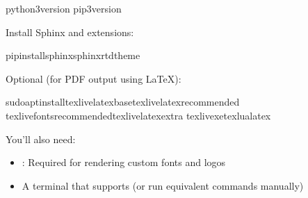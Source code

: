 \documentclass[letterpaper,11pt,oneside,english,openany,oneside]{sphinxmanual}
\begin{document}
\begin{sphinxVerbatim}[commandchars=\\\{\}]
python3\PYGZhy{}\PYGZhy{}version
pip3\PYGZhy{}\PYGZhy{}version
\end{sphinxVerbatim}

\sphinxAtStartPar
Install Sphinx and extensions:

\begin{sphinxVerbatim}[commandchars=\\\{\}]
pipinstallsphinxsphinx\PYGZus{}rtd\PYGZus{}theme
\end{sphinxVerbatim}

\sphinxAtStartPar
Optional (for PDF output using LaTeX):

\begin{sphinxVerbatim}[commandchars=\\\{\}]
sudoaptinstalltexlive\PYGZhy{}latex\PYGZhy{}basetexlive\PYGZhy{}latex\PYGZhy{}recommended
texlive\PYGZhy{}fonts\PYGZhy{}recommendedtexlive\PYGZhy{}latex\PYGZhy{}extra
texlive\PYGZhy{}xetexlualatex
\end{sphinxVerbatim}

\sphinxAtStartPar
You’ll also need:
\begin{itemize}
\item {} 
\sphinxAtStartPar
{}: Required for rendering custom fonts and logos

\item {} 
\sphinxAtStartPar
A terminal that supports  (or run equivalent commands manually)

\end{itemize}

\clearpage



\renewcommand{\indexname}{Index}
\printindex
\end{document}
